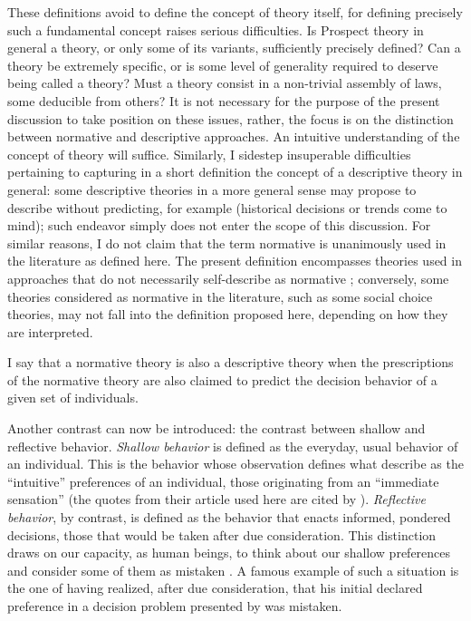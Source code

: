 \documentclass[version=last, pagesize, twoside=off, bibliography=totoc, DIV=calc, fontsize=12pt, a4paper, french, english]{scrartcl}
\begin{document}
These definitions avoid to define the concept of theory itself, for defining precisely such a fundamental concept raises serious difficulties. Is Prospect theory in general a theory, or only some of its variants, sufficiently precisely defined? Can a theory be extremely specific, or is some level of generality required to deserve being called a theory? Must a theory consist in a non-trivial assembly of laws, some deducible from others? It is not necessary for the purpose of the present discussion to take position on these issues, rather, the focus is on the distinction between normative and descriptive approaches. An intuitive understanding of the concept of theory will suffice.
Similarly, I sidestep insuperable difficulties pertaining to capturing in a short definition the concept of a descriptive theory in general: some descriptive theories in a more general sense may propose to describe without predicting, for example (historical decisions or trends come to mind); such endeavor simply does not enter the scope of this discussion. For similar reasons, I do not claim that the term normative is unanimously used in the literature as defined here. The present definition encompasses theories used in approaches that do not necessarily self-describe as normative \citep{bell_decision_1988, meinard_rationality_2019}; conversely, some theories considered as normative in the literature, such as some social choice theories, may not fall into the definition proposed here, depending on how they are interpreted.

I say that a normative theory is also a descriptive theory when the prescriptions of the normative theory are also claimed to predict the decision behavior of a given set of individuals.

Another contrast can now be introduced: the contrast between shallow and reflective behavior. \emph{Shallow behavior} is defined as the everyday, usual behavior of an individual. 
This is the behavior whose observation defines what \citet[p.\ 16]{von_neumann_theory_2004} describe as the “intuitive” preferences of an individual, those originating from an “immediate sensation” (the quotes from their article used here are cited by \citet{fishburn_retrospective_1989}).
\emph{Reflective behavior}, by contrast, is defined as the behavior that enacts informed, pondered decisions, those that would be taken after due consideration.
This distinction draws on our capacity, as human beings, to think about our shallow preferences and consider some of them as mistaken \citep{frankfurt_freedom_1971}. 
A famous example of such a situation is the one of \citet[pp.\ 101--103]{savage_foundations_1972} having realized, after due consideration, that his initial declared preference in a decision problem presented by \citet{allais_so-called_1979} was mistaken.
\end{document}
